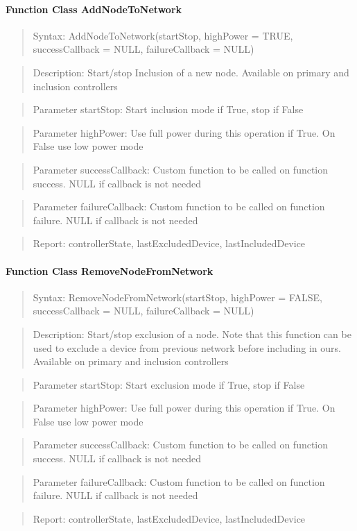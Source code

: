\paragraph{Function Class AddNodeToNetwork}
\begin{quote}Syntax: AddNodeToNetwork(startStop, highPower = TRUE, successCallback = NULL, failureCallback = NULL)\end{quote}
\begin{quote}Description: Start/stop Inclusion of a new node. Available on primary and inclusion controllers\end{quote}
\begin{quote}Parameter startStop: Start inclusion mode if True, stop if False\end{quote}
\begin{quote}Parameter highPower: Use full power during this operation if True. On False use low power mode\end{quote}
\begin{quote}Parameter successCallback: Custom function to be called on function success. NULL if callback is not needed\end{quote}
\begin{quote}Parameter failureCallback: Custom function to be called on function failure. NULL if callback is not needed\end{quote}
\begin{quote}Report: controllerState, lastExcludedDevice, lastIncludedDevice\end{quote}

\paragraph{Function Class RemoveNodeFromNetwork}
\begin{quote}Syntax: RemoveNodeFromNetwork(startStop, highPower = FALSE, successCallback = NULL, failureCallback = NULL)\end{quote}
\begin{quote}Description: Start/stop exclusion of a node. Note that this function can be used to exclude a device from previous network before including in ours. Available on primary and inclusion controllers\end{quote}
\begin{quote}Parameter startStop: Start exclusion mode if True, stop if False\end{quote}
\begin{quote}Parameter highPower: Use full power during this operation if True. On False use low power mode\end{quote}
\begin{quote}Parameter successCallback: Custom function to be called on function success. NULL if callback is not needed\end{quote}
\begin{quote}Parameter failureCallback: Custom function to be called on function failure. NULL if callback is not needed\end{quote}
\begin{quote}Report: controllerState, lastExcludedDevice, lastIncludedDevice\end{quote}

